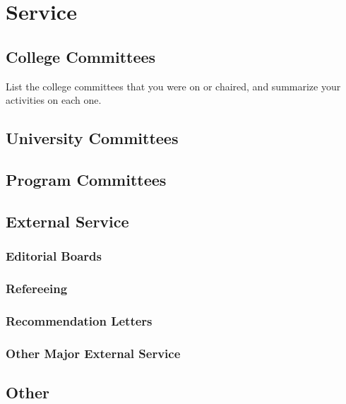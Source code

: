 \documentclass[12pt]{article}
\begin{document}
\section{Service}

\subsection{College Committees}

List the college committees that you were on or chaired, and summarize
your activities on each one.

\subsection{University Committees}

\subsection{Program Committees}

\subsection{External Service}

\subsubsection{Editorial Boards}

\subsubsection{Refereeing}

\subsubsection{Recommendation Letters}

\subsubsection{Other Major External Service}

\subsection{Other}
\end{document}
